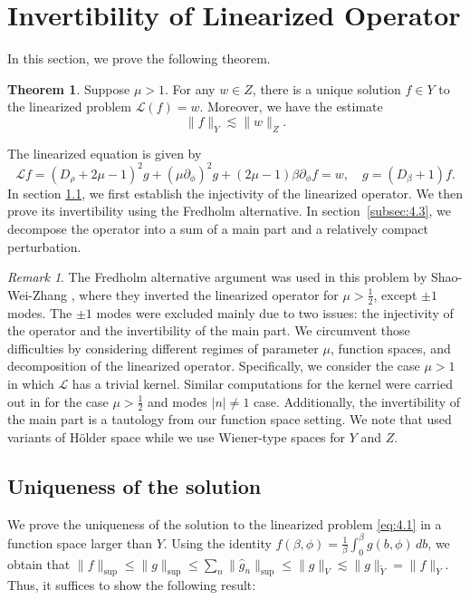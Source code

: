 \documentclass[11pt]{article}
\theoremstyle{definition}
\newtheorem{theorem}{Theorem}[section]
\theoremstyle{remark}
\newtheorem*{remark}{Remark}
\numberwithin{equation}{section}
\newcommand{\mcal}{\mathcal}
\renewcommand{\hat}{\widehat}
\renewcommand{\tilde}{\widetilde}
\newcommand{\del}{\partial}
\newcommand{\norm}[1]{\lVert #1 \rVert}
\begin{document}
\section{Invertibility of Linearized Operator} \label{sec:4}
In this section, we prove the following theorem.
\begin{theorem} \label{thm:4.1}
Suppose $\mu > 1$. For any $w \in Z$, there is a unique solution $f \in Y$ to the linearized problem $\mcal{L}(f) = w$. Moreover, we have the estimate
  \begin{equation*}
    \norm{f}_Y \lesssim \norm{w}_Z.
  \end{equation*}
\end{theorem}
The linearized equation is given by
\begin{equation} \label{eq:4.1}
\mcal{L} f = (D_\rho + 2\mu - 1)^2 g + (\mu\del_\phi)^2 g + (2\mu - 1) \beta \del_\phi f = w, \quad g = (D_\beta + 1) f.
\end{equation}
In section \ref{subsec:4.1}, we first establish the injectivity of the linearized operator. We then prove its invertibility using the Fredholm alternative. In section~\ref{subsec:4.3}, we decompose the operator into a sum of a main part and a relatively compact perturbation.
\begin{remark}
The Fredholm alternative argument was used in this problem by Shao-Wei-Zhang \cite{SWZ25}, where they inverted the linearized operator for $\mu > \frac{1}{2}$, except $\pm 1$ modes. The $\pm 1$ modes were excluded mainly due to two issues: the injectivity of the operator and the invertibility of the main part. We circumvent those difficulties by considering different regimes of parameter $\mu$, function spaces, and decomposition of the linearized operator. Specifically, we consider the case $\mu > 1$ in which $\mcal{L}$ has a trivial kernel. Similar computations for the kernel were carried out in \cite{SWZ25} for the case $\mu > \frac{1}{2}$ and modes $|n|\neq 1$ case. Additionally, the invertibility of the main part is a tautology from our function space setting. We note that \cite{GG24,SWZ25} used variants of Hölder space while we use Wiener-type spaces for $Y$ and $Z$.
\end{remark}

\subsection{Uniqueness of the solution} \label{subsec:4.1}
We prove the uniqueness of the solution to the linearized problem \eqref{eq:4.1} in a function space larger than $Y$. Using the identity $f(\beta,\phi) = \frac{1}{\beta} \int_0^\beta g(b, \phi) \,db$, we obtain that $\norm{f}_{\sup} \leq \norm{g}_{\sup} \leq \sum_{n} \norm{\hat{g}_n}_{\sup} \leq \norm{g}_{V} \lesssim \norm{g}_{\tilde{Y}} = \norm{f}_{Y}$. Thus, it suffices to show the following result:
\end{document}
